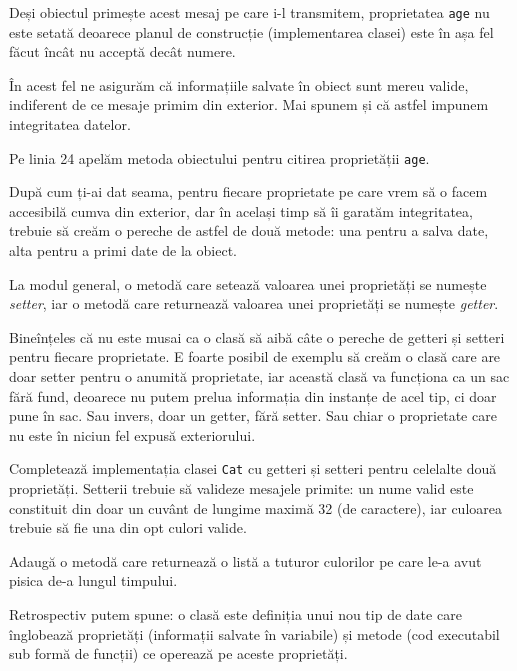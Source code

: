 Deși obiectul primește acest mesaj pe care i-l transmitem, proprietatea
\texttt{age} nu este setată deoarece planul de construcție (implementarea clasei)
este în așa fel făcut încât nu acceptă decât numere.

În acest fel ne asigurăm că informațiile salvate în obiect sunt mereu valide,
indiferent de ce mesaje primim din exterior. Mai spunem și că astfel
impunem integritatea datelor.

Pe linia 24 apelăm metoda obiectului pentru citirea proprietății \texttt{age}.

După cum ți-ai dat seama, pentru fiecare proprietate pe care vrem să
o facem accesibilă cumva din exterior, dar în același timp să îi garatăm
integritatea, trebuie să creăm o pereche de astfel de două metode: una
pentru a salva date, alta pentru a primi date de la obiect.

La modul general, o metodă care setează valoarea unei proprietăți se numește
\textsl{setter}, iar o metodă care returnează valoarea unei proprietăți se
numește \textsl{getter}.

Bineînțeles că nu este musai ca o clasă să aibă câte o pereche
de getteri și setteri pentru fiecare proprietate.
E foarte posibil de exemplu să creăm o clasă care are doar setter pentru
o anumită proprietate, iar această clasă va funcționa ca un sac
fără fund, deoarece nu putem prelua informația din instanțe
de acel tip, ci doar {\glqq}pune în sac{\grqq}. Sau invers, doar
un getter, fără setter. Sau chiar o proprietate care nu este în
niciun fel expusă exteriorului.

\begin{Exercise}[title={A complete Kitty}]
\ExePart
Completează implementația clasei \texttt{Cat} cu getteri și setteri
pentru celelalte două proprietăți. Setterii trebuie să valideze
mesajele primite: un nume valid este constituit din doar un cuvânt
de lungime maximă 32 (de caractere), iar culoarea trebuie
să fie una din opt culori valide.

\ExePart
Adaugă o metodă care returnează o listă a tuturor culorilor pe
care le-a avut pisica de-a lungul timpului.
\end{Exercise}


Retrospectiv putem spune: o clasă este definiția unui nou tip de date
care înglobează proprietăți (informații salvate în variabile) și
metode (cod executabil sub formă de funcții) ce operează pe aceste
proprietăți.






% 
% 
% 
